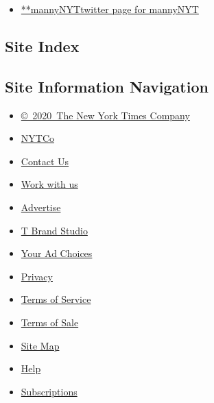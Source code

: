 \begin{itemize}
\tightlist
\item
  \href{https://twitter.com/mannyNYT}{**mannyNYTtwitter page for
  mannyNYT}
\end{itemize}

\hypertarget{site-index}{%
\subsection{Site Index}\label{site-index}}

\hypertarget{site-information-navigation}{%
\subsection{Site Information
Navigation}\label{site-information-navigation}}

\begin{itemize}
\tightlist
\item
  \href{https://help.nytimes.com/hc/en-us/articles/115014792127-Copyright-notice}{©~2020~The
  New York Times Company}
\end{itemize}

\begin{itemize}
\tightlist
\item
  \href{https://www.nytco.com/}{NYTCo}
\item
  \href{https://help.nytimes.com/hc/en-us/articles/115015385887-Contact-Us}{Contact
  Us}
\item
  \href{https://www.nytco.com/careers/}{Work with us}
\item
  \href{https://nytmediakit.com/}{Advertise}
\item
  \href{http://www.tbrandstudio.com/}{T Brand Studio}
\item
  \href{https://www.nytimes.com/privacy/cookie-policy\#how-do-i-manage-trackers}{Your
  Ad Choices}
\item
  \href{https://www.nytimes.com/privacy}{Privacy}
\item
  \href{https://help.nytimes.com/hc/en-us/articles/115014893428-Terms-of-service}{Terms
  of Service}
\item
  \href{https://help.nytimes.com/hc/en-us/articles/115014893968-Terms-of-sale}{Terms
  of Sale}
\item
  \href{https://spiderbites.nytimes.com}{Site Map}
\item
  \href{https://help.nytimes.com/hc/en-us}{Help}
\item
  \href{https://www.nytimes.com/subscription?campaignId=37WXW}{Subscriptions}
\end{itemize}
